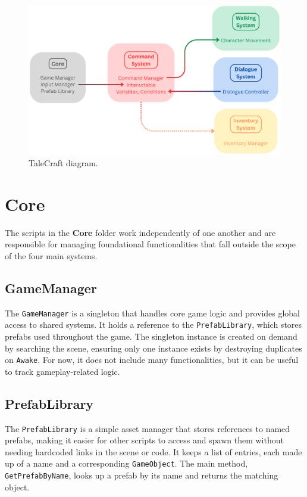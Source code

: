 \begin{figure}[H]
\centering
\includegraphics[width=0.85\linewidth]{img/framework_systems.png}
\caption{TaleCraft diagram.}
\label{fig:TaleCraft}
\end{figure}

\section{Core}
\label{Core}
The scripts in the \textbf{Core} folder work independently of one another and are responsible for managing foundational functionalities that fall outside the scope of the four main systems. 

\subsection{GameManager}
The \verb|GameManager| is a singleton that handles core game logic and provides global access to shared systems. It holds a reference to the \verb|PrefabLibrary|, which stores prefabs used throughout the game. The singleton instance is created on demand by searching the scene, ensuring only one instance exists by destroying duplicates on \verb|Awake|. For now, it does not include many functionalities, but it can be useful to track gameplay-related logic.

\subsection{PrefabLibrary}
The \verb|PrefabLibrary| is a simple asset manager that stores references to named prefabs, making it easier for other scripts to access and spawn them without needing hardcoded links in the scene or code. It keeps a list of entries, each made up of a name and a corresponding \verb|GameObject|. The main method, \verb|GetPrefabByName|, looks up a prefab by its name and returns the matching object.

